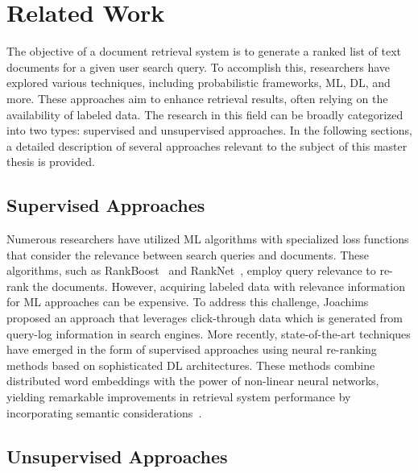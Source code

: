 
\chapter{Related Work}

The objective of a document retrieval system is to generate a ranked list of text documents for a given user search query. To accomplish this, researchers have explored various techniques, including probabilistic frameworks, \ac{ML}, \ac{DL}, and more. These approaches aim to enhance retrieval results, often relying on the availability of labeled data. The research in this field can be broadly categorized into two types: supervised and unsupervised approaches. In the following sections, a detailed description of several approaches relevant to the subject of this master thesis is provided.

\section{Supervised Approaches}


Numerous researchers have utilized \ac{ML} algorithms with specialized loss functions that consider the relevance between search queries and documents. These algorithms, such as RankBoost~\cite{freund2003efficient} and RankNet~\cite{burges2005learning}, employ query relevance to re-rank the documents. However, acquiring labeled data with relevance information for \ac{ML} approaches can be expensive. To address this challenge, Joachims~\cite{joachims2002optimizing} proposed an approach that leverages click-through data which is generated from query-log information in search engines. More recently, state-of-the-art techniques have emerged in the form of supervised approaches using neural re-ranking methods based on sophisticated \ac{DL} architectures. These methods combine distributed word embeddings with the power of non-linear neural networks, yielding remarkable improvements in retrieval system performance by incorporating semantic considerations~\cite{mitra2017learning, guo2016deep, nogueira2019passage}.

\section{Unsupervised Approaches}

